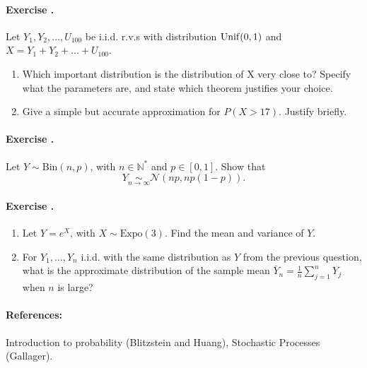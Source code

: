 \documentclass[twocolumn,12pt,a4paper]{article}
\newcommand{\calN}{\mathcal N}
\newcounter{num}  %
\begin{document}
	\paragraph{Exercise \thenum.}
	Let $Y_1, Y_2,\ldots, U_{100}$ be i.i.d. r.v.s with distribution  ${\rm Unif}(0,1)$ and $X = Y_1 + Y_2 + \ldots + U_{100}$.
	\begin{enumerate}
		\item Which important distribution is the distribution of X very close to? Specify what
		the parameters are, and state which theorem justifies your choice.
		\item Give a simple but accurate approximation for $P(X > 17)$. Justify briefly.
	\end{enumerate}
	
	
	\paragraph{Exercise \thenum.}
Let $Y \sim \text{Bin}(n, p)$, with $n\in\mathbb N^*$ and $p\in[0,1]$. 
Show that 
$$
 Y\underset{n\rightarrow\infty}{\sim}\calN\left(np, np(1 - p)\right).
$$	


\paragraph{Exercise \thenum.}
	\begin{enumerate}
	\item Let $Y = e^X$, with $X \sim \text{Expo}(3)$. Find the mean and variance of $Y$.
\item For $Y_1, \dots, Y_n$ i.i.d. with the same distribution as $Y$ from the previous question, what is the approximate distribution of the sample mean $\bar{Y}_n = \frac{1}{n} \sum_{j=1}^{n} Y_j$ when $n$ is large?
	\end{enumerate}


	\paragraph{References:} Introduction to probability (Blitzstein and Huang), Stochastic Processes (Gallager).
\end{document}
